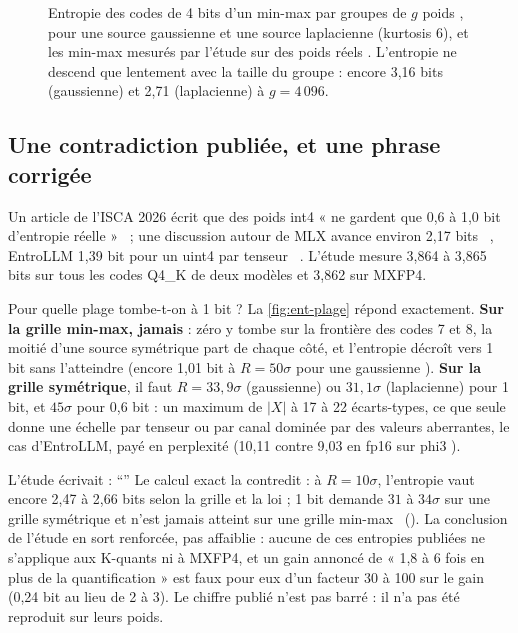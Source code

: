 \begin{figure}[ht]
\centering
\GrapheEntropieGroupes
\caption[Entropie des codes d'un min-max selon la taille du groupe]{Entropie des codes de 4 bits d'un min-max par groupes de $g$ poids \calc, pour une source gaussienne et une source laplacienne (kurtosis 6), et les min-max mesurés par l'étude sur des poids réels \mes. L'entropie ne descend que lentement avec la taille du groupe : encore 3,16 bits (gaussienne) et 2,71 (laplacienne) à $g = 4\,096$.}
\label{fig:ent-groupes}
\end{figure}

\subsection{Une contradiction publiée, et une phrase corrigée}\label{sec:ent-contradiction}

Un article de l'ISCA 2026 écrit que des poids int4 « ne gardent que 0,6 à 1,0 bit d'entropie réelle »~\cite{shannonbound2026} \litt ; une discussion autour de MLX avance environ 2,17 bits~\cite{mlx3043} \litt, EntroLLM 1,39 bit pour un uint4 par tenseur~\cite{entrollm2025} \litt. L'étude mesure 3,864 à 3,865 bits sur tous les codes Q4\_K de deux modèles et 3,862 sur MXFP4.

Pour quelle plage tombe-t-on à 1 bit ? La \cref{fig:ent-plage} répond exactement. \textbf{Sur la grille min-max, jamais} : zéro y tombe sur la frontière des codes 7 et 8, la moitié d'une source symétrique part de chaque côté, et l'entropie décroît vers 1 bit sans l'atteindre (encore 1,01 bit à $R = 50\sigma$ pour une gaussienne \calc). \textbf{Sur la grille symétrique}, il faut $R = 33{,}9\sigma$ (gaussienne) ou $31{,}1\sigma$ (laplacienne) pour 1 bit, et $45\sigma$ pour 0,6 bit \calc : un maximum de $|X|$ à 17 à 22 écarts-types, ce que seule donne une échelle par tenseur ou par canal dominée par des valeurs aberrantes, le cas d'EntroLLM, payé en perplexité (10,11 contre 9,03 en fp16 sur phi3 \litt).

L'étude écrivait : \enquote{} Le calcul exact la contredit : à $R = 10\sigma$, l'entropie vaut encore 2,47 à 2,66 bits selon la grille et la loi ; 1 bit demande $31$ à $34\sigma$ sur une grille symétrique et n'est jamais atteint sur une grille min-max \calc~(). La conclusion de l'étude en sort renforcée, pas affaiblie : aucune de ces entropies publiées ne s'applique aux K-quants ni à MXFP4, et un gain annoncé de « 1,8 à 6 fois en plus de la quantification » est faux pour eux d'un facteur 30 à 100 sur le gain (0,24 bit au lieu de 2 à 3). Le chiffre publié n'est pas barré : il n'a pas été reproduit sur leurs poids.

